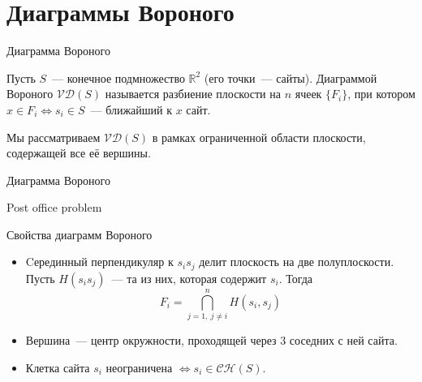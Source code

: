 \section{Диаграммы Вороного}

    \begin{frame}{Диаграмма Вороного}

        \begin{defn}

            Пусть $S$~--- конечное подмножество $\mathbb{R}^2$ (его точки~--- \alert{сайты}).
            Диаграммой Вороного $\mathcal{V}\mathcal{D}(S)$ называется разбиение плоскости на $n$ ячеек $\{ F_i \}$, при котором $x \in F_i
            \Leftrightarrow s_i \in S$~--- ближайший к $x$ \alert{сайт}.

        \end{defn}

        Мы рассматриваем $\mathcal{V}\mathcal{D}(S)$ в рамках ограниченной области плоскости, содержащей все её
        вершины.

    \end{frame}

    \begin{frame}{Диаграмма Вороного}
        
        \begin{center}


        \end{center}

        
    \end{frame}

    \begin{frame}{Post office problem}
    \vspace{-17.5mm}
    \begin{center}


    \end{center}

    \end{frame}

    \begin{frame}{Свойства диаграмм Вороного}

        \begin{itemize}

            \item Cерединный перпендикуляр к $s_i s_j$ делит плоскость на две полуплоскости. Пусть $H(s_i s_j)$~--- та из них, которая содержит $s_i$.
                  Тогда
                  \[ F_i = \bigcap\limits_{j = 1, \ j \neq i}^{n} H(s_i, s_j)\]

            \item Вершина~--- центр окружности, проходящей через 3 соседних с ней сайта.

            \item Клетка сайта $s_i$ неограничена $\Leftrightarrow s_i \in \mathcal{C}\mathcal{H}(S)$.

        \end{itemize}

    \end{frame}

